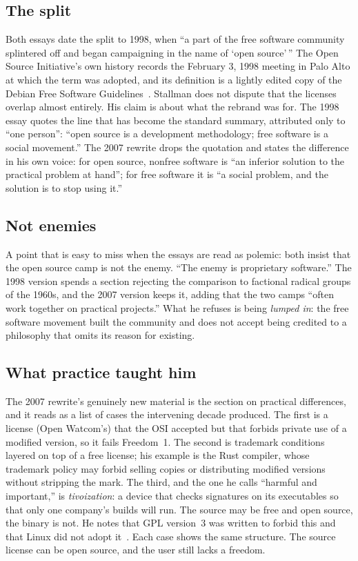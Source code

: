 \documentclass[10pt,letterpaper,twocolumn]{article}
\newcommand{\term}[1]{``#1''}
\begin{document}
\subsection{The split}

Both essays date the split to 1998, when \term{a part of the free software community splintered off and began campaigning in the name of `open source'\,} The Open Source Initiative's own history records the February 3, 1998 meeting in Palo Alto at which the term was adopted, and its definition is a lightly edited copy of the Debian Free Software Guidelines~\citep{osi_history,osi_definition}. Stallman does not dispute that the licenses overlap almost entirely. His claim is about what the rebrand was for. The 1998 essay quotes the line that has become the standard summary, attributed only to \term{one person}: \term{open source is a development methodology; free software is a social movement.} The 2007 rewrite drops the quotation and states the difference in his own voice: for open source, nonfree software is \term{an inferior solution to the practical problem at hand}; for free software it is \term{a social problem, and the solution is to stop using it.}

\subsection{Not enemies}

A point that is easy to miss when the essays are read as polemic: both insist that the open source camp is not the enemy. \term{The enemy is proprietary software.} The 1998 version spends a section rejecting the comparison to factional radical groups of the 1960s, and the 2007 version keeps it, adding that the two camps \term{often work together on practical projects.} What he refuses is being \emph{lumped in}: the free software movement built the community and does not accept being credited to a philosophy that omits its reason for existing.

\subsection{What practice taught him}

The 2007 rewrite's genuinely new material is the section on practical differences, and it reads as a list of cases the intervening decade produced. The first is a license (Open Watcom's) that the OSI accepted but that forbids private use of a modified version, so it fails Freedom~1. The second is trademark conditions layered on top of a free license; his example is the Rust compiler, whose trademark policy may forbid selling copies or distributing modified versions without stripping the mark. The third, and the one he calls \term{harmful and important,} is \emph{tivoization}: a device that checks signatures on its executables so that only one company's builds will run. The source may be free and open source, the binary is not. He notes that GPL version~3 was written to forbid this and that Linux did not adopt it~\citep{gpl3}. Each case shows the same structure. The source license can be open source, and the user still lacks a freedom.
\end{document}

